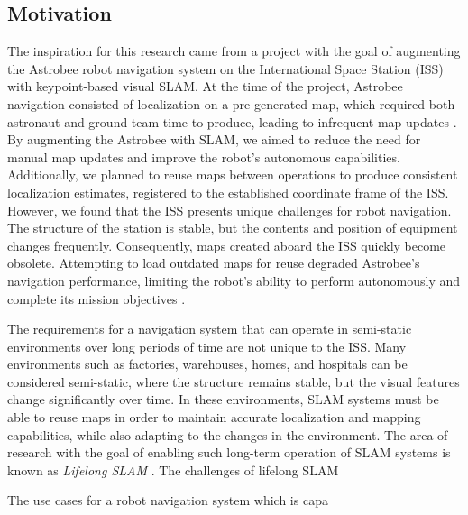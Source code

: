 \subsection{Motivation}


The inspiration for this research came from a project with the goal of augmenting the Astrobee robot navigation system on the International Space Station (ISS) with keypoint-based visual SLAM. At the time of the project, Astrobee navigation consisted of localization on a pre-generated map, which required both astronaut and ground team time to produce, leading to infrequent map updates \cite{soussanAstroLocEfficientRobust2022}. By augmenting the Astrobee with SLAM, we aimed to reduce the need for manual map updates and improve the robot's autonomous capabilities. Additionally, we planned to reuse maps between operations to produce consistent localization estimates, registered to the established coordinate frame of the ISS. However, we found that the ISS presents unique challenges for robot navigation. The structure of the station is stable, but the contents and position of equipment changes frequently. Consequently, maps created aboard the ISS quickly become obsolete. Attempting to load outdated maps for reuse degraded Astrobee's navigation performance, limiting the robot's ability to perform autonomously and complete its mission objectives \cite{zuralesCollaborativeSensingMapping2024}.


The requirements for a navigation system that can operate in semi-static environments over long periods of time are not unique to the ISS. Many environments such as factories, warehouses, homes, and hospitals can be considered semi-static, where the structure remains stable, but the visual features change significantly over time. In these environments, SLAM systems must be able to reuse maps in order to maintain accurate localization and mapping capabilities, while also adapting to the changes in the environment. The area of research with the goal of enabling such long-term operation of SLAM systems is known as \textit{Lifelong SLAM} \cite{bujancaRobustSLAMSystems2021}. The challenges of lifelong SLAM


The use cases for a robot navigation system which is capa